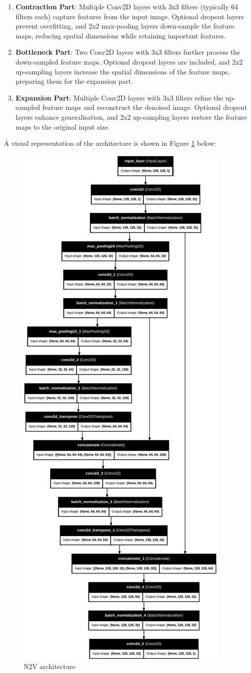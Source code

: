\begin{enumerate}
	\item \textbf{Contraction Part}: Multiple Conv2D layers with 3x3 filters (typically 64 filters each) capture features from the input image. Optional dropout layers prevent overfitting, and 2x2 max-pooling layers down-sample the feature maps, reducing spatial dimensions while retaining important features.
	\item \textbf{Bottleneck Part}: Two Conv2D layers with 3x3 filters further process the down-sampled feature maps. Optional dropout layers are included, and 2x2 up-sampling layers increase the spatial dimensions of the feature maps, preparing them for the expansion part.
	\item \textbf{Expansion Part}: Multiple Conv2D layers with 3x3 filters refine the up-sampled feature maps and reconstruct the denoised image. Optional dropout layers enhance generalisation, and 2x2 up-sampling layers restore the feature maps to the original input size. 
\end{enumerate}
A visual representation of the architecture is shown in Figure \ref{fig:N2Varch} below:
\begin{figure}[h!]
	\centering
	\includegraphics[width=0.5\linewidth]{3_Chapters//3_Chapter_Methodology//Figures/noise2void_model.png}
	\caption{\gls{N2V} architecture}
	\label{fig:N2Varch}
\end{figure}

